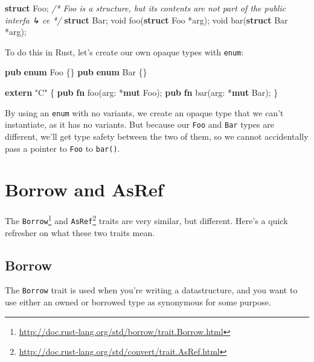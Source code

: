 \documentclass[a4paper,]{book}
\newenvironment{Shaded}{\begin{snugshade}}{\end{snugshade}}
\newcommand{\KeywordTok}[1]{\textcolor[rgb]{0.13,0.29,0.53}{\textbf{{#1}}}}
\newcommand{\DataTypeTok}[1]{\textcolor[rgb]{0.13,0.29,0.53}{{#1}}}
\newcommand{\StringTok}[1]{\textcolor[rgb]{0.31,0.60,0.02}{{#1}}}
\newcommand{\CommentTok}[1]{\textcolor[rgb]{0.56,0.35,0.01}{\textit{{#1}}}}
\newcommand{\NormalTok}[1]{{#1}}
\renewcommand{\href}[2]{#2\footnote{\url{#1}}}
\begin{document}
\begin{Shaded}
\begin{Highlighting}[]
\KeywordTok{struct} \NormalTok{Foo; }\CommentTok{/* Foo is a structure, but its contents are not part of the public interfa}
\CommentTok{↳ ce */}
\KeywordTok{struct} \NormalTok{Bar;}
\DataTypeTok{void} \NormalTok{foo(}\KeywordTok{struct} \NormalTok{Foo *arg);}
\DataTypeTok{void} \NormalTok{bar(}\KeywordTok{struct} \NormalTok{Bar *arg);}
\end{Highlighting}
\end{Shaded}

To do this in Rust, let's create our own opaque types with
\texttt{enum}:

\begin{Shaded}
\begin{Highlighting}[]
\KeywordTok{pub} \KeywordTok{enum} \NormalTok{Foo \{\}}
\KeywordTok{pub} \KeywordTok{enum} \NormalTok{Bar \{\}}

\KeywordTok{extern} \StringTok{"C"} \NormalTok{\{}
    \KeywordTok{pub} \KeywordTok{fn} \NormalTok{foo(arg: *}\KeywordTok{mut} \NormalTok{Foo);}
    \KeywordTok{pub} \KeywordTok{fn} \NormalTok{bar(arg: *}\KeywordTok{mut} \NormalTok{Bar);}
\NormalTok{\}}
\end{Highlighting}
\end{Shaded}

By using an \texttt{enum} with no variants, we create an opaque type
that we can't instantiate, as it has no variants. But because our
\texttt{Foo} and \texttt{Bar} types are different, we'll get type safety
between the two of them, so we cannot accidentally pass a pointer to
\texttt{Foo} to \texttt{bar()}.

\section{Borrow and AsRef}\label{sec--borrow-and-asref}

The
\href{http://doc.rust-lang.org/std/borrow/trait.Borrow.html}{\texttt{Borrow}}
and
\href{http://doc.rust-lang.org/std/convert/trait.AsRef.html}{\texttt{AsRef}}
traits are very similar, but different. Here's a quick refresher on what
these two traits mean.

\subsection{Borrow}\label{borrow}

The \texttt{Borrow} trait is used when you're writing a datastructure,
and you want to use either an owned or borrowed type as synonymous for
some purpose.
\end{document}
